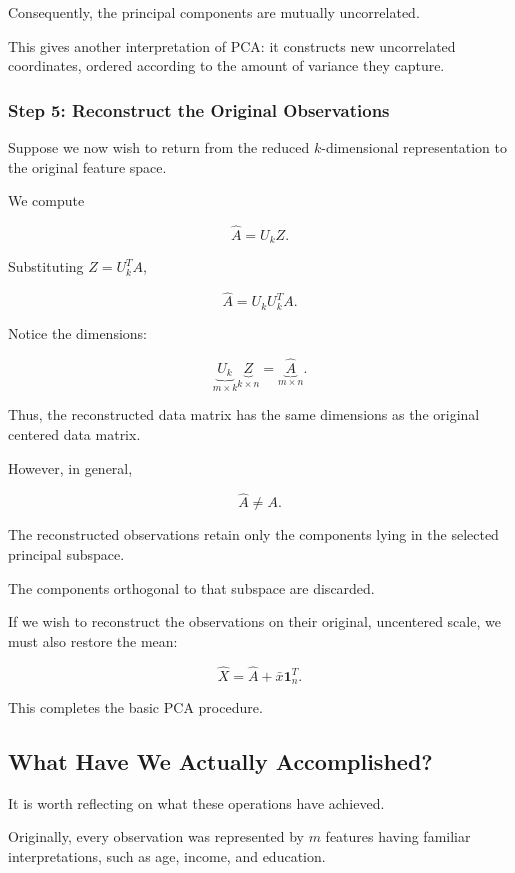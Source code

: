 \documentclass[11pt]{article}
\begin{document}
Consequently, the principal
components are mutually
uncorrelated.

This gives another interpretation
of PCA: it constructs new
uncorrelated coordinates,
ordered according to the
amount of variance they capture.

\subsubsection*{Step 5: Reconstruct the
Original Observations}

Suppose we now wish to
return from the reduced
$k$-dimensional representation
to the original feature space.

We compute

\[
\boxed{
\widehat{A}=U_kZ.
}
\]

Substituting $Z=U_k^TA$,

\[
\boxed{
\widehat{A}=U_kU_k^TA.
}
\]

Notice the dimensions:

\[
\underbrace{U_k}_{m\times k}
\underbrace{Z}_{k\times n}
=
\underbrace{\widehat{A}}_{m\times n}.
\]

Thus, the reconstructed
data matrix has the same
dimensions as the original
centered data matrix.

However, in general,

\[
\widehat{A}\neq A.
\]

The reconstructed observations
retain only the components
lying in the selected principal
subspace.

The components orthogonal to
that subspace are discarded.

If we wish to reconstruct
the observations on their
original, uncentered scale,
we must also restore the mean:

\[
\boxed{
\widehat{X}
=
\widehat{A}
+
\bar{x}\mathbf{1}_n^T.
}
\]

This completes the basic
PCA procedure.


    

\subsection{What Have We Actually Accomplished?}

It is worth reflecting on what
these operations have achieved.

Originally, every observation
was represented by $m$
features having familiar
interpretations, such as age,
income, and education.
\end{document}

